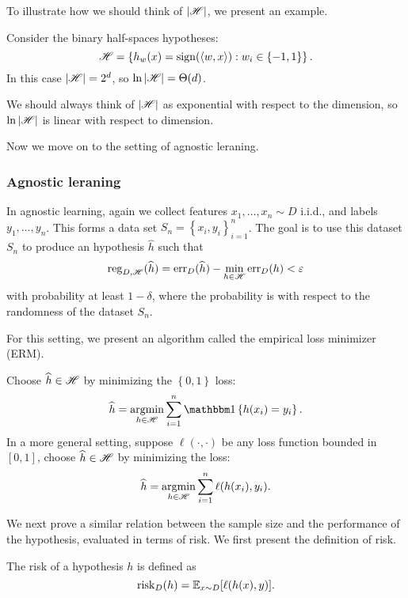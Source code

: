\documentclass[a4paper]{article}
\begin{document}
To illustrate how we should think of $\left\lvert \mathscr{H}\right\rvert$, 
we present an example.
\begin{eg}
Consider the binary half-spaces hypotheses: 
\[
\mathscr{H} = \left\{ h_w(x) = \operatorname{sign}(\left\langle w, x \right\rangle) : 
w_i \in \left\{ -1, 1 \right\} \right\}.
\]
In this case $\left\lvert \mathscr{H}\right\rvert = 2^d$, so $\ln \left\lvert \mathscr{H}\right\rvert = 
\Theta(d)$. 

We should always think of $\left\lvert \mathscr{H}\right\rvert$
as exponential with respect to the dimension, so 
$\ln \left\lvert \mathscr{H}\right\rvert$ is linear with respect to dimension.
\end{eg}

Now we move on to the setting of agnostic leraning.

\subsubsection{Agnostic leraning}

In agnostic learning, again we collect features $x_1, \dots,
x_n \sim D$ i.i.d., and labels $y_1, \dots, y_n$. This forms a 
data set $S_n = \left\{ x_i, y_i \right\}_{i=1}^n$. The 
goal is to use this dataset $S_n$ to produce an hypothesis 
$\hat{h}$ such that 
\[
\operatorname{reg}_{D, \mathscr{H}} (\widehat{h}) = 
\operatorname{err}_D (\widehat{h}) - \min_{h \in \mathscr{H}} \operatorname{err}_D (h) < \varepsilon
\]
with probability at least $1 - \delta$, where the probability
is with respect to the randomness of the dataset $S_n$.

For this setting, we present an algorithm called the empirical 
loss minimizer (ERM). 
\begin{algorithm}
  Choose $\widehat{h} \in \mathscr{H}$ by minimizing the $\left\{ 0,1
   \right\}$ loss:
  \[
  \hat{h} = \argmin_{h \in \scrh} \sum_{i=1}^n \ind \left\{ 
    h(x_i) = y_i
   \right\}.
  \]
  In a more general setting, suppose $\ell(\cdot, \cdot)$ 
  be any loss function bounded in $[0, 1]$, choose 
  $\widehat{h} \in \mathscr{H}$ by minimizing the loss:
  \[
  \widehat{h} = \operatorname*{argmin}_{h \in \mathscr{H}} \sum_{i=1}^n \ell(h(x_i), 
  y_i).
  \] 
\end{algorithm}

We next prove a similar relation between the sample 
size and the performance of the hypothesis, evaluated 
in terms of risk. We first present the definition 
of risk.

\begin{defi}[Risk]
  The risk of a hypothesis $h$ is defined as 
  \[
  \operatorname{risk}_D (h) = \mathbb{E}_{x \sim D} [ \ell(h(x), y) ].
  \]
\end{defi}
\end{document}
